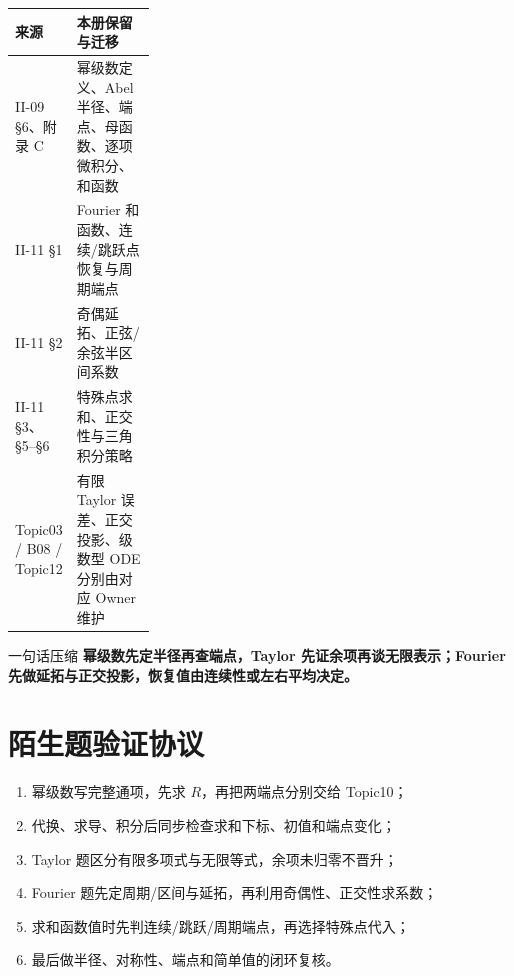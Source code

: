 \documentclass[11pt,a4paper,fontset=fandol]{ctexart}
\begin{document}
\begin{tabularx}{\linewidth}{L{0.28\linewidth}Y}
\toprule
来源 & 本册保留与迁移 \\
\midrule
II-09 §6、附录 C & 幂级数定义、Abel 半径、端点、母函数、逐项微积分、和函数 \\
II-11 §1 & Fourier 和函数、连续/跳跃点恢复与周期端点 \\
II-11 §2 & 奇偶延拓、正弦/余弦半区间系数 \\
II-11 §3、§5--§6 & 特殊点求和、正交性与三角积分策略 \\
Topic03 / B08 / Topic12 & 有限 Taylor 误差、正交投影、级数型 ODE 分别由对应 Owner 维护 \\
\bottomrule
\end{tabularx}

\begin{corebox}{一句话压缩}
\textbf{幂级数先定半径再查端点，Taylor 先证余项再谈无限表示；Fourier 先做延拓与正交投影，恢复值由连续性或左右平均决定。}
\end{corebox}

\section{陌生题验证协议}
\begin{enumerate}
  \item 幂级数写完整通项，先求 $R$，再把两端点分别交给 Topic10；
  \item 代换、求导、积分后同步检查求和下标、初值和端点变化；
  \item Taylor 题区分有限多项式与无限等式，余项未归零不晋升；
  \item Fourier 题先定周期/区间与延拓，再利用奇偶性、正交性求系数；
  \item 求和函数值时先判连续/跳跃/周期端点，再选择特殊点代入；
  \item 最后做半径、对称性、端点和简单值的闭环复核。
\end{enumerate}
\end{document}
